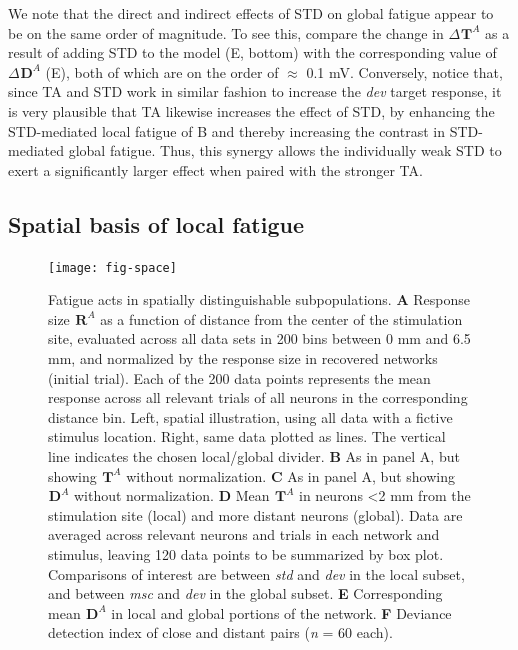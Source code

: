 \documentclass[9pt,lineno,onehalfspacing]{elife}
\newcommand{\dev}{\textit{dev}}
\newcommand{\msc}{\textit{msc}}
\newcommand{\std}{\textit{std}}
\newcommand{\R}[3][]{{}^{#1}_{}\boldsymbol R^{#2}_{#3}}
\newcommand{\T}[3][]{{}^{#1}_{}\boldsymbol T^{#2}_{#3}}
\newcommand{\D}[3][]{{}^{#1}_{}\boldsymbol D^{#2}_{#3}}
\begin{document}
We note that the direct and indirect effects of STD on global fatigue appear to be on the same order of magnitude. To see this, compare the change in $\Delta \T{A}{}$ as a result of adding STD to the model (E, bottom) with the corresponding value of $\Delta \D{A}{}$ (E), both of which are on the order of $\approx$ 0.1 mV. Conversely, notice that, since TA and STD work in similar fashion to increase the \dev{} target response, it is very plausible that TA likewise increases the effect of STD, by enhancing the STD-mediated local fatigue of B and thereby increasing the contrast in STD-mediated global fatigue. Thus, this synergy allows the individually weak STD to exert a significantly larger effect when paired with the stronger TA.

\subsection{Spatial basis of local fatigue}

\begin{figure}
    \texttt{[image: fig-space]}
    \caption{%
        Fatigue acts in spatially distinguishable subpopulations.
        \textbf{A} Response size $\R{A}{}$ as a function of distance from the center of the stimulation site, evaluated across all data sets in 200 bins between 0 mm and 6.5 mm, and normalized by the response size in recovered networks (initial trial). Each of the 200 data points represents the mean response across all relevant trials of all neurons in the corresponding distance bin. Left, spatial illustration, using all data with a fictive stimulus location. Right, same data plotted as lines. The vertical line indicates the chosen local/global divider.
        \textbf{B} As in panel A, but showing $\T{A}{}$ without normalization.
        \textbf{C} As in panel A, but showing $\D{A}{}$ without normalization.
        \textbf{D} Mean $\T{A}{}$ in neurons <2 mm from the stimulation site (local) and more distant neurons (global). Data are averaged across relevant neurons and trials in each network and stimulus, leaving 120 data points to be summarized by box plot. Comparisons of interest are between \std{} and \dev{} in the local subset, and between \msc{} and \dev{} in the global subset.
        \textbf{E} Corresponding mean $\D{A}{}$ in local and global portions of the network.
        \textbf{F} Deviance detection index of close and distant pairs (\textit{n} = 60 each).
    }
    \label{fig:space}
\end{figure}
\end{document}
